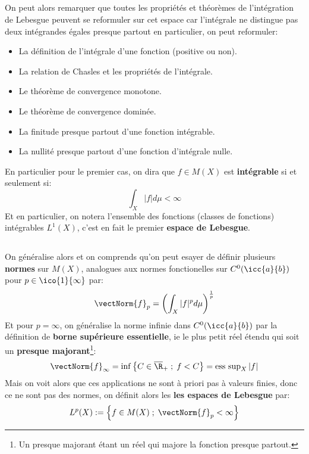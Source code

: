 \subsection*{}
On peut alors remarquer que toutes les propriétés et théorèmes de l'intégration de Lebesgue peuvent se reformuler sur cet espace car l'intégrale ne distingue pas deux intégrandes égales presque partout en particulier, on peut reformuler:
\begin{itemize}
   \item La définition de l'intégrale d'une fonction (positive ou non).
   \item La relation de Chasles et les propriétés de l'intégrale.
   \item Le théorème de convergence monotone.
   \item Le théorème de convergence dominée.
   \item La finitude presque partout d'une fonction intégrable.
   \item La nullité presque partout d'une fonction d'intégrale nulle.
\end{itemize}
En particulier pour le premier cas, on dira que \( f \in M(X) \) est \textbf{intégrable} si et seulement si:
\[ 
   \int_X |f| d\mu < \infty 
\]
Et en particulier, on notera l'ensemble des fonctions (classes de fonctions) intégrables \( L^1(X) \), c'est en fait le premier \textbf{espace de Lebesgue}.
\pagebreak
\subsection*{}
On généralise alors et on comprends qu'on peut esayer de définir plusieurs \textbf{normes} sur \( M(X) \), analogues aux normes fonctionelles sur \( C^0( \icc{a}{b}) \) pour \( p \in \ico{1}{ \infty} \) par:
\[ 
   \vectNorm{f}_p = \left ( \int_X |f|^p d \mu\right)^{ \frac{1}{p}} 
\]
Et pour \( p = \infty \), on généralise la norme infinie dans \( C^0( \icc{a}{b}) \) par la définition de \textbf{borne supérieure essentielle}, ie le plus petit réel étendu qui soit un \textbf{presque majorant}\footnote[1]{Un presque majorant étant un réel qui majore la fonction presque partout.}:
\[ 
   \vectNorm{f}_\infty = \inf\left\{ C \in \overline{\R}_+ \; ; \; f < C \right\} = \text{ess sup}_X\left|f \right| 
\]
Mais on voit alors que ces applications ne sont à priori pas à valeurs finies, donc ce ne sont pas des normes, on définit alors les \textbf{les espaces de Lebesgue} par:
\[ 
   L^p(X) := \left\{ f \in M(X) \; ; \; \vectNorm{f}_p < \infty \right\}  
\]
